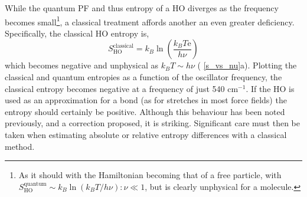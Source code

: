 \documentclass[../main.tex]{subfiles}
\begin{document}
While the quantum PF and thus entropy of a HO diverges as the frequency becomes small\footnote{As it should with the Hamiltonian becoming that of a free particle, with $S_\text{HO}^\text{quantum} \sim k_B\ln(k_B T/h\nu) : \nu \ll 1$, but is clearly unphysical for a molecule.}, a classical treatment affords another an even greater deficiency. Specifically, the classical HO entropy is,
\begin{equation}
S^\text{classical}_\text{HO} = k_B \ln\left(\frac{k_BT\text{e}}{h\nu}\right)
\end{equation}
which becomes negative and unphysical as $k_BT \sim h\nu$ (\figurename{ \ref{s_vs_nu}a}). Plotting the classical and quantum entropies as a function of the oscillator frequency, the classical entropy becomes negative at a frequency of just 540 cm$^{-1}$. If the HO is used as an approximation for a bond (as for stretches in most force fields) the entropy should certainly be positive. Although this behaviour has been noted previously, and a correction proposed,\cite{Schlitter1993} it is striking. Significant care must then be taken when estimating absolute or relative entropy differences with a classical method.
\end{document}
